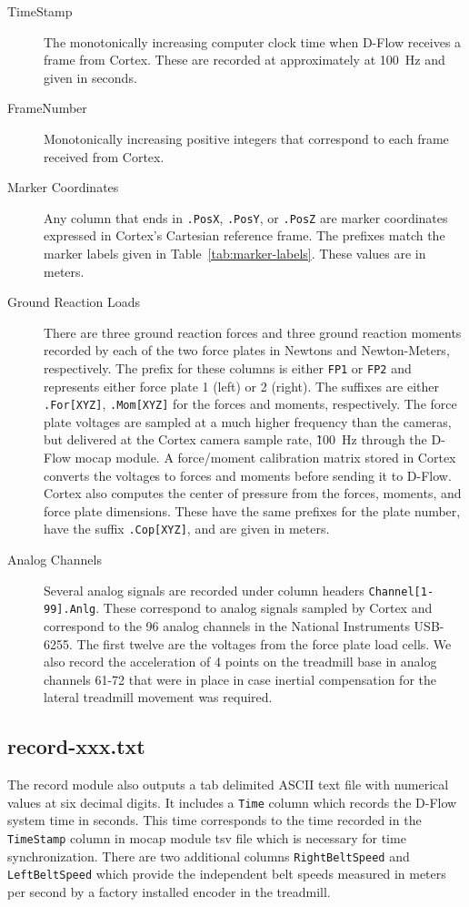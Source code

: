 \documentclass[fleqn,10pt]{wlpeerj}
\begin{document}
\begin{description}
  \item[TimeStamp] The monotonically increasing computer clock time when D-Flow
    receives a frame from Cortex. These are recorded at approximately at
    100~\si{\hertz} and given in seconds.
  \item[FrameNumber] Monotonically increasing positive integers that correspond
    to each frame received from Cortex.
  \item[Marker Coordinates] Any column that ends in \verb+.PosX+, \verb+.PosY+,
    or \verb+.PosZ+ are marker coordinates expressed in Cortex's Cartesian
    reference frame. The prefixes match the marker labels given in
    Table~\ref{tab:marker-labels}. These values are in meters.
  \item[Ground Reaction Loads] There are three ground reaction forces and three
    ground reaction moments recorded by each of the two force plates in Newtons
    and Newton-Meters, respectively. The prefix for these columns is either
    \verb+FP1+ or \verb+FP2+ and represents either force plate 1 (left) or 2
    (right). The suffixes are either \verb+.For[XYZ]+, \verb+.Mom[XYZ]+ for the
    forces and moments, respectively. The force plate voltages are sampled at a
    much higher frequency than the cameras, but delivered at the Cortex camera
    sample rate, \~100~\si{\hertz} through the D-Flow mocap module. A
    force/moment calibration matrix stored in Cortex converts the voltages to
    forces and moments before sending it to D-Flow. Cortex also computes
    the center of pressure from the forces, moments, and force plate
    dimensions. These have the same prefixes for the plate number, have the
    suffix \verb+.Cop[XYZ]+, and are given in meters.
  \item[Analog Channels] Several analog signals are recorded under column
    headers \verb+Channel[1-99].Anlg+. These correspond to analog signals
    sampled by Cortex and correspond to the 96 analog channels in the National
    Instruments USB-6255. The first twelve are the voltages from the
    force plate load cells. We also record the acceleration of 4 points on the
    treadmill base in analog channels 61-72 that were in place in case inertial
    compensation for the lateral treadmill movement was required.
\end{description}

\subsection*{record-xxx.txt}
%
The record module also outputs a tab delimited ASCII text file with numerical
values at six decimal digits. It includes a \verb+Time+ column which records
the D-Flow system time in seconds. This time corresponds to the time recorded
in the \verb+TimeStamp+ column in mocap module tsv file which is necessary for
time synchronization. There are two additional columns \verb+RightBeltSpeed+
and \verb+LeftBeltSpeed+ which provide the independent belt speeds measured in
meters per second by a factory installed encoder in the treadmill.
\end{document}
